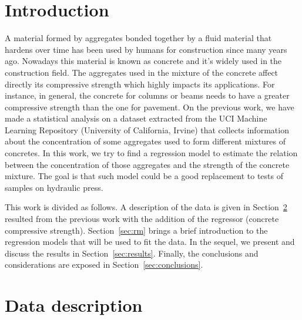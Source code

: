 \documentclass[conference]{IEEEtran}
\begin{document}
\section{Introduction}
A material formed by aggregates bonded together by a fluid material that hardens over time has been used by humans for construction since many years ago\cite{b3}. Nowadays this material is known as concrete and it's widely used in the construction field. The aggregates used in the mixture of the concrete affect directly its compressive strength which highly impacts its applications. For instance, in general, the concrete for columns or beams needs to have a greater compressive strength than the one for pavement. On the previous work, we have made a statistical analysis on a dataset extracted from the UCI Machine Learning Repository (University of California, Irvine)\cite{b4} that collects information about the concentration of some aggregates used to form different mixtures of concretes. In this work, we try to find a regression model to estimate the relation between the concentration of those aggregates and the strength of the concrete mixture. The goal is that such model could be a good replacement to tests of samples on hydraulic press.

This work is divided as follows. A description of the data is given in Section~\ref{sec:data_description} resulted from the previous work with the addition of the regressor (concrete compressive strength). Section~\ref{sec:rm} brings a brief introduction to the regression models that will be used to fit the data. In the sequel, we present and discuss the results in Section~\ref{sec:results}. Finally, the conclusions and considerations are exposed in Section~\ref{sec:conclusions}.


\section{Data description}\label{sec:data_description}
\end{document}
